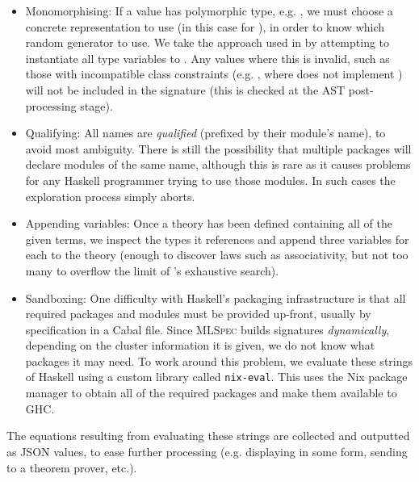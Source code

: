 \begin{itemize}
\item{Monomorphising}: If a value has polymorphic type, e.g. , we must choose a concrete representation to use (in this
  case for ), in order to know which random generator to use. We take the
  approach used in \qcheck{} by attempting to instantiate all type variables to
  . Any values where this is invalid, such as those with
  incompatible class constraints (e.g. , where
   does not implement ) will not be included in the
  signature (this is checked at the AST post-processing stage).

\item{Qualifying}: All names are \emph{qualified} (prefixed by their module's
  name), to avoid most ambiguity. There is still the possibility that multiple
  packages will declare modules of the same name, although this is rare as it
  causes problems for any Haskell programmer trying to use those modules. In
  such cases the exploration process simply aborts.

\item{Appending variables}: Once a \qspec{} theory has been defined containing
  all of the given terms, we inspect the types it references and append three
  variables for each to the theory (enough to discover laws such as
  associativity, but not too many to overflow the limit of \qspec{}'s exhaustive
  search).

\item{Sandboxing}: One difficulty with Haskell's packaging infrastructure is
  that all required packages and modules must be provided up-front, usually by
  specification in a Cabal file. Since \textsc{MLSpec} builds signatures
  \emph{dynamically}, depending on the cluster information it is given, we do
  not know what packages it may need. To work around this problem, we evaluate
  these strings of Haskell using a custom library called \texttt{nix-eval}. This
  uses the Nix package manager to obtain all of the required packages and make
  them available to GHC.

\end{itemize}

The equations resulting from evaluating these strings are collected and
outputted as JSON values, to ease further processing (e.g. displaying in some
form, sending to a theorem prover, etc.).
